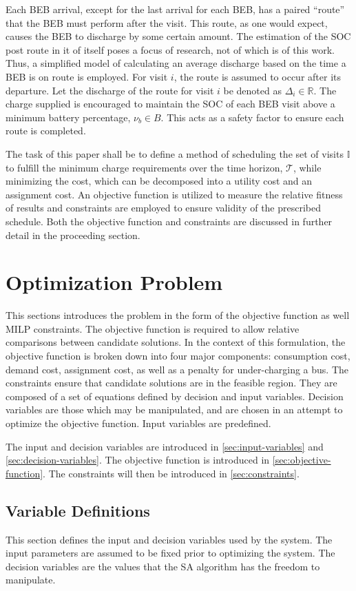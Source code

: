 \documentclass[11pt,a4paper,final]{article}
\newcommand{\T}{\mathcal{T}}                %
\newcommand{\I}{\mathbb{I}}                 %
\begin{document}
Each BEB arrival, except for the last arrival for each BEB, has a paired ``route'' that the BEB must perform after the
visit. This route, as one would expect, causes the BEB to discharge by some certain amount. The estimation of the SOC
post route in it of itself poses a focus of research, not of which is of this work. Thus, a simplified model of
calculating an average discharge based on the time a BEB is on route is employed. For visit \(i\), the route is assumed to
occur after its departure. Let the discharge of the route for visit \(i\) be denoted as \(\Delta_i \in \mathbb{R}\). The charge supplied is
encouraged to maintain the SOC of each BEB visit above a minimum battery percentage, \(\nu_b \in B\). This acts as a safety
factor to ensure each route is completed.

The task of this paper shall be to define a method of scheduling the set of visits \(\I\) to fulfill the minimum charge
requirements over the time horizon, \(\T\), while minimizing the cost, which can be decomposed into a utility cost and an
assignment cost. An objective function is utilized to measure the relative fitness of results and constraints are
employed to ensure validity of the prescribed schedule. Both the objective function and constraints are discussed in
further detail in the proceeding section.
\section{Optimization Problem}
\label{sec:optimization-problem}
This sections introduces the problem in the form of the objective function as well MILP constraints. The objective
function is required to allow relative comparisons between candidate solutions. In the context of this formulation, the
objective function is broken down into four major components: consumption cost, demand cost, assignment cost, as well as
a penalty for under-charging a bus. The constraints ensure that candidate solutions are in the feasible region. They are
composed of a set of equations defined by decision and input variables. Decision variables are those which may be
manipulated, and are chosen in an attempt to optimize the objective function. Input variables are predefined.

The input and decision variables are introduced in \ref{sec:input-variables} and \ref{sec:decision-variables}. The
objective function is introduced in \ref{sec:objective-function}. The constraints will then be introduced in
\ref{sec:constraints}.

\subsection{Variable Definitions}
\label{sec:parameter-definitions}
This section defines the input and decision variables used by the system. The input parameters are assumed to be fixed
prior to optimizing the system. The decision variables are the values that the SA algorithm has the freedom to
manipulate.
\end{document}
